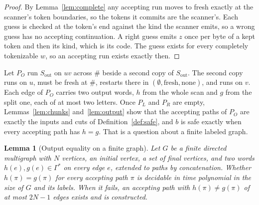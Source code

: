 \documentclass[11pt,a4paper]{article}
\theoremstyle{definition}
\theoremstyle{plain}
\newtheorem{lemma}{Lemma}
\begin{document}
\begin{proof}
By Lemma~\ref{lem:complete} any accepting run moves to fresh exactly at the scanner's token boundaries, so the tokens it
commits are the scanner's. Each guess is checked at the token's end against the kind the scanner emits, so a wrong guess
has no accepting continuation. A right guess emits $z$ once per byte of a kept token and then its kind, which is its
code. The guess exists for every completely tokenizable $w$, so an accepting run exists exactly then.
\end{proof}

Let $P_O$ run $S_{\mathrm{out}}$ on $uv$ across $\#$ beside a second copy of $S_{\mathrm{out}}$. The second copy runs on
$u$, must be fresh at $\#$, restarts there in $(\emptyset, \mathrm{fresh}, \mathrm{none})$, and runs on $v$. Each edge
of $P_O$ carries two output words, $h$ from the whole scan and $g$ from the split one, each of at most two letters. Once
$P_L$ and $P_R$ are empty, Lemmas~\ref{lem:chunks} and~\ref{lem:output} show that the accepting paths of $P_O$ are
exactly the inputs and cuts of Definition~\ref{def:safe}, and $b$ is safe exactly when every accepting path has $h = g$.
That is a question about a finite labeled graph.

\begin{lemma}[Output equality on a finite graph]
\label{lem:equality}
Let $G$ be a finite directed multigraph with $N$ vertices, an initial vertex, a set of final vertices, and two words
$h(e), g(e) \in \Gamma^*$ on every edge $e$, extended to paths by concatenation. Whether $h(\pi) = g(\pi)$ for every
accepting path $\pi$ is decidable in time polynomial in the size of $G$ and its labels. When it fails, an accepting path
with $h(\pi) \neq g(\pi)$ of at most $2N - 1$ edges exists and is constructed.
\end{lemma}
\end{document}
